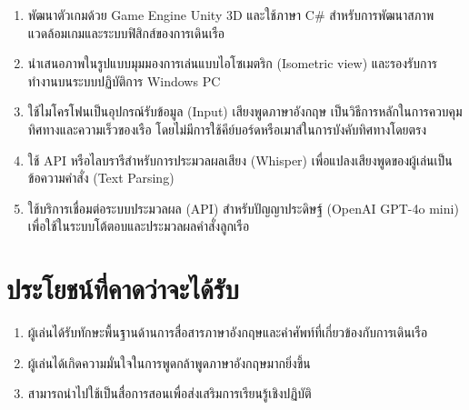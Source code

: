 \begin{enumerate}[label=\arabic*)]
    \item พัฒนาตัวเกมด้วย Game Engine Unity 3D และใช้ภาษา C\# สำหรับการพัฒนาสภาพแวดล้อมเกมและระบบฟิสิกส์ของการเดินเรือ
    \item นำเสนอภาพในรูปแบบมุมมองการเล่นแบบไอโซเมตริก (Isometric view) และรองรับการทำงานบนระบบปฏิบัติการ Windows PC
    \item ใช้ไมโครโฟนเป็นอุปกรณ์รับข้อมูล (Input) เสียงพูดภาษาอังกฤษ เป็นวิธีการหลักในการควบคุมทิศทางและความเร็วของเรือ โดยไม่มีการใช้คีย์บอร์ดหรือเมาส์ในการบังคับทิศทางโดยตรง
    \item ใช้ API หรือไลบรารีสำหรับการประมวลผลเสียง (Whisper) เพื่อแปลงเสียงพูดของผู้เล่นเป็นข้อความคำสั่ง (Text Parsing)
    \item ใช้บริการเชื่อมต่อระบบประมวลผล (API) สำหรับปัญญาประดิษฐ์ (OpenAI GPT-4o mini) เพื่อใช้ในระบบโต้ตอบและประมวลผลคำสั่งลูกเรือ
\end{enumerate}

\section{ประโยชน์ที่คาดว่าจะได้รับ}

\begin{enumerate}[label=\arabic*)]
    \item ผู้เล่นได้รับทักษะพื้นฐานด้านการสื่อสารภาษาอังกฤษและคำศัพท์ที่เกี่ยวข้องกับการเดินเรือ
    \item ผู้เล่นได้เกิดความมั่นใจในการพูดกล้าพูดภาษาอังกฤษมากยิ่งขึ้น
    \item สามารถนำไปใช้เป็นสื่อการสอนเพื่อส่งเสริมการเรียนรู้เชิงปฏิบัติ
\end{enumerate}